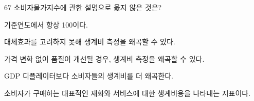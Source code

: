 \begin{question}{67}
소비자물가지수에 관한 설명으로 옳지 않은 것은?
\begin{choices}
  \item 기준연도에서 항상 100이다.
  \item 대체효과를 고려하지 못해 생계비 측정을 왜곡할 수 있다.
  \item 가격 변화 없이 품질이 개선될 경우, 생계비 측정을 왜곡할 수 있다.
  \item GDP 디플레이터보다 소비자들의 생계비를 더 왜곡한다.
  \item 소비자가 구매하는 대표적인 재화와 서비스에 대한 생계비용을 나타내는 지표이다.
\end{choices}
\end{question}
